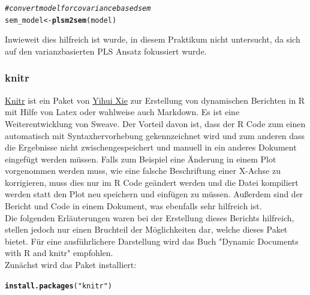 \documentclass{article}\usepackage[]{graphicx}\usepackage[]{color}
\makeatletter
\newcommand{\hlstr}[1]{\textcolor[rgb]{0.192,0.494,0.8}{#1}}%
\newcommand{\hlcom}[1]{\textcolor[rgb]{0.678,0.584,0.686}{\textit{#1}}}%
\newcommand{\hlstd}[1]{\textcolor[rgb]{0.345,0.345,0.345}{#1}}%
\newcommand{\hlkwb}[1]{\textcolor[rgb]{0.69,0.353,0.396}{#1}}%
\newcommand{\hlkwd}[1]{\textcolor[rgb]{0.737,0.353,0.396}{\textbf{#1}}}%
\newenvironment{kframe}{%
 \def\at@end@of@kframe{}%
 \ifinner\ifhmode%
  \def\at@end@of@kframe{\end{minipage}}%
  \begin{minipage}{\columnwidth}%
 \fi\fi%
 \def\FrameCommand##1{\hskip\@totalleftmargin \hskip-\fboxsep
 \colorbox{shadecolor}{##1}\hskip-\fboxsep
     \hskip-\linewidth \hskip-\@totalleftmargin \hskip\columnwidth}%
 \MakeFramed {\advance\hsize-\width
   \@totalleftmargin\z@ \linewidth\hsize
   \@setminipage}}%
 {\par\unskip\endMakeFramed%
 \at@end@of@kframe}
\newenvironment{knitrout}{}{} %
\makeatother
\begin{document}
\begin{knitrout}
\color{fgcolor}\begin{kframe}
\begin{alltt}
\hlcom{#convert model for covariance based sem}
\hlstd{sem_model} \hlkwb{<-} \hlkwd{plsm2sem}\hlstd{(model)}
\end{alltt}
\end{kframe}
\end{knitrout}
Inwieweit dies hilfreich ist wurde, in diesem Praktikum nicht untersucht, da sich auf den varianzbasierten PLS Ansatz fokussiert wurde.

\subsubsection{knitr}
\href{http://cran.r-project.org/web/packages/knitr/index.html}{Knitr} ist ein Paket von \href{http://yihui.name/knitr/}{Yihui Xie} zur Erstellung von dynamischen Berichten in R mit Hilfe von Latex oder wahlweise auch Markdown. Es ist eine Weiterentwicklung von Sweave.\cite{lmucs-papers:Leisch:2002} Der Vorteil davon ist, dass der R Code zum einen automatisch mit Syntaxhervorhebung gekennzeichnet wird und zum anderen dass die Ergebnisse nicht zwischengespeichert und manuell in ein anderes Dokument eingefügt werden müssen. Falls zum Beispiel eine Änderung in einem Plot vorgenommen werden muss, wie eine falsche Beschriftung einer X-Achse zu korrigieren, muss dies nur im R Code geändert werden und die Datei kompiliert werden statt den Plot neu speichern und einfügen zu müssen. Außerdem sind der Bericht und Code in einem Dokument, was ebenfalls sehr hilfreich ist.\\
Die folgenden Erläuterungen waren bei der Erstellung dieses Berichts hilfreich, stellen jedoch nur einen Bruchteil der Möglichkeiten dar, welche dieses Paket bietet. Für eine ausführlichere Darstellung wird das Buch "Dynamic Documents with R and knitr" empfohlen.\cite{xie2013dynamic}\\
Zunächst wird das Paket installiert:
\begin{knitrout}
\color{fgcolor}\begin{kframe}
\begin{alltt}
\hlkwd{install.packages}\hlstd{(}\hlstr{"knitr"}\hlstd{)}
\end{alltt}
\end{kframe}
\end{knitrout}
\end{document}

